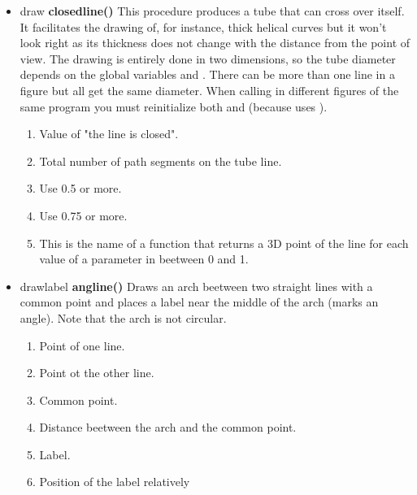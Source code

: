 \begin{itemize}
\item draw {\bfseries closedline()} This procedure produces
a tube that can cross over itself. It
facilitates the drawing of, for instance, thick
helical curves but it won't
look right as its thickness does not change with the
distance from the point of view. The drawing is
entirely done in two dimensions, so the tube diameter
depends on the global variables  and
. There can be more than one
line in a figure but all get the same diameter.
When calling  in different
figures of the same program you must reinitialize both
 and  (because
 uses ).
\begin{enumerate}
\item {} Value of "the line is closed".
\item {} Total number of path segments
on the tube line.
\item {} Use 0.5 or more.
\item {} Use 0.75 or more.
\item {} This is the name of a function
that returns a 3D point of the line for each value
of a parameter in beetween 0 and 1.
\end{enumerate}
\item drawlabel {\bfseries angline()}
Draws an arch beetween two straight lines with a
common point and places a label
near the middle of the arch (marks an
angle). Note that the arch is not circular. 
\begin{enumerate}
\item {} Point of one line.
\item {} Point ot the other line.
\item {} Common point.
\item {} Distance beetween the arch and
the common point.
\item {} Label.
\item {} Position of the label relatively

\end{enumerate}
\end{itemize}
